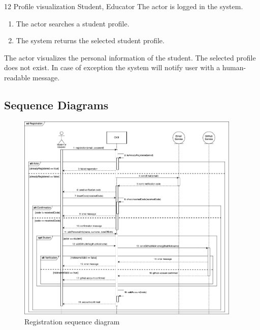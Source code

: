 \clearpage

\usecase
{12}
{Profile visualization} %
{Student, Educator} %
{The actor is logged in the system.} %
{ %
    \begin{enumerate}
        \item The actor searches a student profile.
        \item The system returns the selected student profile.
    \end{enumerate}
}
{The actor visualizes the personal information of the student.} %
{ %
 The selected profile does not exist. 
}
{ %
In case of exception the system will notify user with a human-readable message.
}

\subsection{Sequence Diagrams}
\begin{figure}[H]
    \centering
    \includegraphics[width=0.95\textwidth]{images/seq_diagrams/Registration.jpg}
    \caption{Registration sequence diagram}
    \label{fig:sequence_diagram}
\end{figure}
\clearpage

